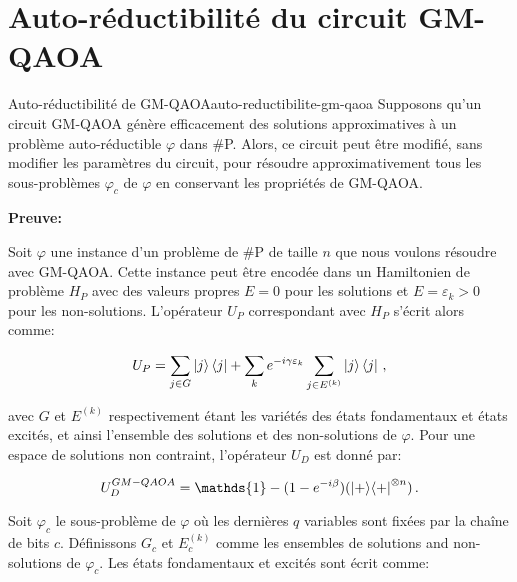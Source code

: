 \begin{comment}
\end{comment}


\chapter{Auto-réductibilité du circuit GM-QAOA}


\begin{maintheorem}{Auto-réductibilité de GM-QAOA}{auto-reductibilite-gm-qaoa}
    Supposons qu'un circuit GM-QAOA génère efficacement des solutions approximatives à un problème auto-réductible $\varphi$ dans \textsf{\#P}. Alors, ce circuit peut être modifié, sans modifier les paramètres du circuit, pour résoudre approximativement tous les sous-problèmes $\varphi_{c}$ de $\varphi$ en conservant les propriétés de GM-QAOA.
\end{maintheorem}

\noindent
\textbf{Preuve:} 

Soit $\varphi$ une instance d'un problème de \textsf{\#P} de taille $n$ que nous voulons résoudre avec GM-QAOA. Cette instance peut être encodée dans un Hamiltonien de problème $H_{P}$ avec des valeurs propres $E = 0$ pour les solutions et $E = \varepsilon_{k} > 0$ pour les non-solutions. L'opérateur $U_{P}$ correspondant avec $H_{P}$ s'écrit alors comme:

\begin{equation}
    U_{P} = \sum_{j \in G} \ket{j}\bra{j} + \sum_{k} e^{-i \gamma \varepsilon_{k}} \sum_{j \in E^{(k)}} \ket{j}\bra{j} \,,
\end{equation} 

avec $G$ et $E^{(k)}$ respectivement étant les variétés des états fondamentaux et états excités, et ainsi l'ensemble des solutions et des non-solutions de $\varphi$. Pour une espace de solutions non contraint, l'opérateur $U_{D}$ est donné par:

\begin{equation}
    U_{D}^{GM-QAOA} = \mathds{1} - (1 - e^{-i\beta}) (\ket{+}\!\bra{+}^{\otimes n}) \,.
\end{equation}

Soit $\varphi_{c}$ le sous-problème de $\varphi$ où les dernières $q$ variables sont fixées par la chaîne de bits $c$. Définissons $G_{c}$ et $E_{c}^{(k)}$ comme les ensembles de solutions and non-solutions de $\varphi_{c}$. Les états fondamentaux et excités sont écrit comme:

